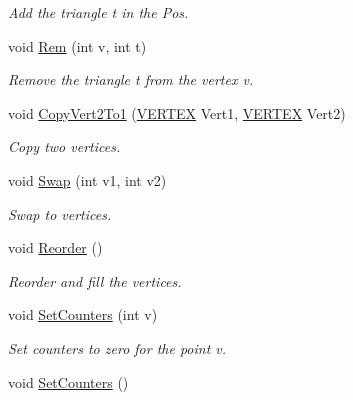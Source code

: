\begin{DoxyCompactItemize}
\begin{DoxyCompactList}\small\item\em \-Add the triangle t in the \-Pos. \end{DoxyCompactList}\item 
\hypertarget{classNeiVertex_a8c5cc8bfb6783d235a0b273821f5e475}{void \hyperlink{classNeiVertex_a8c5cc8bfb6783d235a0b273821f5e475}{\-Rem} (int v, int t)}\label{classNeiVertex_a8c5cc8bfb6783d235a0b273821f5e475}

\begin{DoxyCompactList}\small\item\em \-Remove the triangle t from the vertex v. \end{DoxyCompactList}\item 
\hypertarget{classNeiVertex_a2be4fa5175ea113c1762d2a4cbc21091}{void \hyperlink{classNeiVertex_a2be4fa5175ea113c1762d2a4cbc21091}{\-Copy\-Vert2\-To1} (\hyperlink{structVERTEX}{\-V\-E\-R\-T\-E\-X} \-Vert1, \hyperlink{structVERTEX}{\-V\-E\-R\-T\-E\-X} \-Vert2)}\label{classNeiVertex_a2be4fa5175ea113c1762d2a4cbc21091}

\begin{DoxyCompactList}\small\item\em \-Copy two vertices. \end{DoxyCompactList}\item 
\hypertarget{classNeiVertex_aa22b5926829059f1b8f5ee084497f2ab}{void \hyperlink{classNeiVertex_aa22b5926829059f1b8f5ee084497f2ab}{\-Swap} (int v1, int v2)}\label{classNeiVertex_aa22b5926829059f1b8f5ee084497f2ab}

\begin{DoxyCompactList}\small\item\em \-Swap to vertices. \end{DoxyCompactList}\item 
\hypertarget{classNeiVertex_aeeb3068ff4b57530bda6a4f1180fe383}{void \hyperlink{classNeiVertex_aeeb3068ff4b57530bda6a4f1180fe383}{\-Reorder} ()}\label{classNeiVertex_aeeb3068ff4b57530bda6a4f1180fe383}

\begin{DoxyCompactList}\small\item\em \-Reorder and fill the vertices. \end{DoxyCompactList}\item 
void \hyperlink{classNeiVertex_a86a3208513ff31c3391998f4900f52b5}{\-Set\-Counters} (int v)
\begin{DoxyCompactList}\small\item\em \-Set counters to zero for the point v. \end{DoxyCompactList}\item 
\hypertarget{classNeiVertex_a7c3a47a119b3c06d24a0c8a370fef66c}{void \hyperlink{classNeiVertex_a7c3a47a119b3c06d24a0c8a370fef66c}{\-Set\-Counters} ()}\label{classNeiVertex_a7c3a47a119b3c06d24a0c8a370fef66c}


\end{DoxyCompactItemize}
